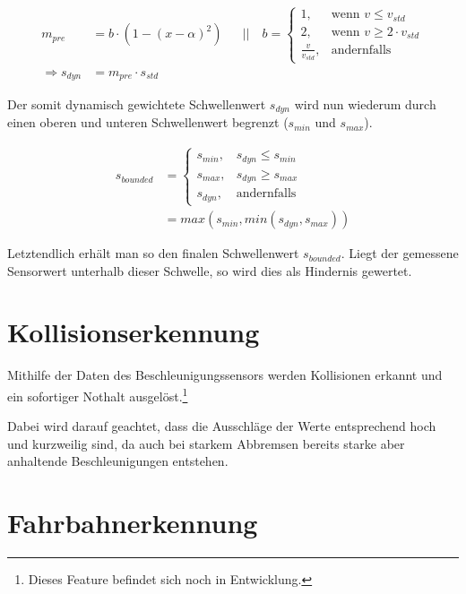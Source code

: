 \documentclass[a4paper,12pt]{report}
\begin{document}
	\begin{align*}
		m_{pre} &= b \cdot \left(1 - \left(x-\alpha\right)^2\right)
		&&||\quad b=
		\begin{cases}
		1,					& \text{wenn } v \leq v_{std} \\
		2,					& \text{wenn } v \geq 2 \cdot v_{std} \\
		\frac{v}{v_{std}}, 	& \text{andernfalls}
		\end{cases}
		\\
		\Rightarrow s_{dyn} &= m_{pre} \cdot s_{std}
	\end{align*}

	Der somit dynamisch gewichtete Schwellenwert $s_{dyn}$ wird nun wiederum durch einen oberen und unteren Schwellenwert begrenzt ($s_{min}$ und $s_{max}$).

	\begin{align*}
		s_{bounded} &=
		\begin{cases}
		s_{min},										& s_{dyn} \leq s_{min} \\
		s_{max},										& s_{dyn} \geq s_{max} \\
		s_{dyn}, 										& \text{andernfalls}
		\end{cases}
		\\
		&= max(s_{min}, min(s_{dyn}, s_{max}))
	\end{align*}

	Letztendlich erhält man so den finalen Schwellenwert $s_{bounded}$.
	Liegt der gemessene Sensorwert unterhalb dieser Schwelle, so wird dies als Hindernis gewertet.

\chapter{Kollisionserkennung}

	Mithilfe der Daten des Beschleunigungssensors werden Kollisionen erkannt und ein sofortiger Nothalt ausgelöst.\footnote{Dieses Feature befindet sich noch in Entwicklung.}

	Dabei wird darauf geachtet, dass die Ausschläge der Werte entsprechend hoch und kurzweilig sind, da auch bei starkem Abbremsen bereits starke aber anhaltende Beschleunigungen entstehen.


\chapter{Fahrbahnerkennung}
\end{document}
